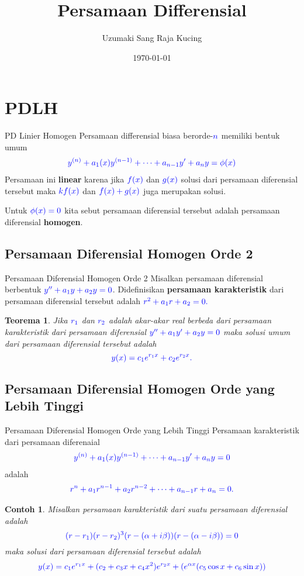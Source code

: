 \documentclass{beamer}
\title[Persamaan Differensial]{Persamaan Differensial} %
\author{Uzumaki Sang Raja Kucing} %
\institute[ITB] %
{
Institut Teknologi Bandung \\ %
\medskip
\textit{nagato.uzumaki17@yahoo.com} %
}
\date{\today} %
\newtheorem{contoh}{Contoh}
\newtheorem{teorema}{Teorema}
\begin{document}
\begin{frame}
\titlepage %
\end{frame}
\section{PDLH}
\begin{frame}{PD Linier Homogen}
Persamaan differensial biasa berorde-$\color{blue}n$ memiliki bentuk umum
\begin{align*}
\color{blue} y^{(n)}+a_1(x)y^{(n-1)}+\cdots+a_{n-1}y'+a_ny=\phi(x)
\end{align*}
Persamaan ini \textbf{linear} karena jika $\color{blue}f(x)$ dan $\color{blue}g(x)$ solusi dari persamaan diferensial tersebut maka $\color{blue}kf(x)$ dan $\color{blue}f(x)+g(x)$ juga merupakan solusi. 

Untuk $\color{blue}\phi(x)=0$ kita sebut persamaan diferensial tersebut adalah persamaan diferensial \textbf{homogen}.
\end{frame}
\subsection{Persamaan Diferensial Homogen Orde 2}
\begin{frame}{Persamaan Diferensial Homogen Orde 2}
	Misalkan persamaan diferensial berbentuk $\color{blue}y''+a_1y+a_2y=0$. \pause
	Didefinisikan \textbf{persamaan karakteristik } dari persamaan diferensial tersebut adalah $\color{blue} r^2+a_1r+a_2=0.$ \pause 
	\begin{teorema}
		Jika $\color{blue}r_1$ dan $\color{blue}r_2$ adalah akar-akar real berbeda dari persamaan karakteristik dari persamaan diferensial $\color{blue}y''+a_1y'+a_2y=0$ maka solusi umum dari persamaan diferensial tersebut adalah $$\color{blue}y(x)=c_1e^{r_1x}+c_2e^{r_2x}.$$
	\end{teorema}
\end{frame}


\subsection{Persamaan Diferensial Homogen Orde yang Lebih Tinggi}
\begin{frame}{Persamaan Diferensial Homogen Orde yang Lebih Tinggi}
Persamaan karakteristik dari persamaan diferenaial
\begin{align*}
\color{blue} y^{(n)}+a_1(x)y^{(n-1)}+\cdots+a_{n-1}y'+a_ny=0
\end{align*}
adalah 
\begin{align*}
\color{blue} r^n+a_1r^{n-1}+a_2r^{n-2}+\cdots+a_{n-1}r+a_n=0.
\end{align*}
\begin{contoh}
	Misalkan persamaan karakteristik dari suatu persamaan diferensial adalah $$\color{blue}(r-r_1)(r-r_2)^3(r-(\alpha+i\beta))(r-(\alpha-i\beta))=0$$
	maka solusi dari persamaan diferensial tersebut adalah
	\begin{align*}
	\color{blue} y(x)=c_1e^{r_1x}+(c_2+c_3x+c_4x^2)e^{r_2x}+(e^{\alpha x}(c_5\cos x+c_6\sin x))
	\end{align*}
\end{contoh}
\end{frame}
\end{document}
